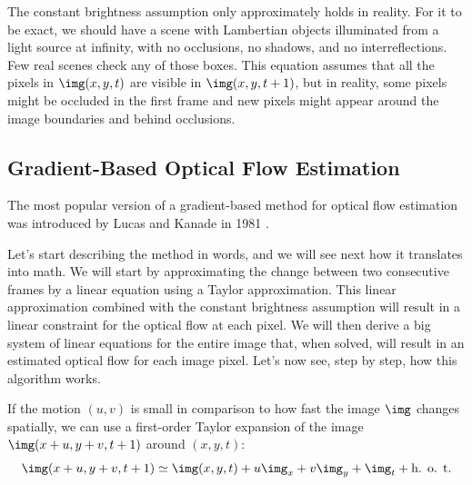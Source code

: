 
The constant brightness assumption only approximately holds in reality. For it to be exact, we should have a scene with Lambertian objects illuminated from a light source at infinity, with no occlusions, no shadows, and no interreflections. Few real scenes check any of those boxes. This equation assumes that all the pixels in $\img(x, y, t)$ are visible in $\img(x, y, t+1)$, but in reality, some pixels might be occluded in the first frame and new pixels might appear around the image boundaries and behind occlusions. 




\subsection{Gradient-Based Optical Flow Estimation}


The most popular version of a gradient-based method for optical flow estimation was introduced by Lucas and Kanade in 1981 \cite{Lucas1981}.

Let's start describing the method in words, and we will see next how it translates into math. We will start by approximating the change between two consecutive frames by a linear equation using a Taylor approximation. This linear approximation combined with the constant brightness assumption will result in a linear constraint for the optical flow at each pixel. We will then derive a big system of linear equations for the entire image that, when solved, will result in an estimated optical flow for each image pixel. Let's now see, step by step, how this algorithm works. 



If the motion $(u,v)$ is small in comparison to how fast the image $\img$ changes spatially, we can use a first-order Taylor expansion of the image $\img (x +u, y+v, t + 1)$ around $(x,y,t)$:
\begin{equation}
\img (x +u, y+v, t + 1)  \simeq \img (x,y,t) + u \img_x  + v \img_y + \img_t + \mbox{h. o. t.}
\label{eq:motion_taylor}
\end{equation}

